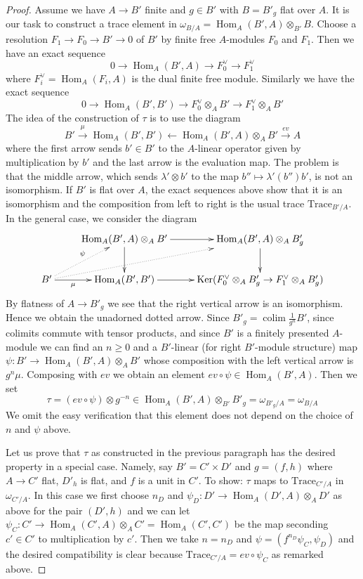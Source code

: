 \documentclass[10pt,a4paper]{amsart}
\theoremstyle{plain}
\theoremstyle{definition}
\theoremstyle{remark}
\numberwithin{equation}{subsection}
\def\colim{\mathop{\mathrm{colim}}\nolimits}
\def\Hom{\mathop{\mathrm{Hom}}\nolimits}
\def\Ker{\mathop{\mathrm{Ker}}}
\begin{document}
\begin{proof}
\medskip\noindent
Assume we have $A \to B'$ finite and $g \in B'$ with $B = B'_g$ flat over $A$.
It is our task to construct a trace element in
$\omega_{B/A} = \Hom_A(B', A) \otimes_{B'} B$.
Choose a resolution $F_1 \to F_0 \to B' \to 0$ of $B'$ by finite free
$A$-modules $F_0$ and $F_1$. Then we have an exact sequence
$$
0 \to \Hom_A(B', A) \to F_0^\vee \to F_1^\vee
$$
where $F_i^\vee = \Hom_A(F_i, A)$ is the dual finite free module.
Similarly we have the exact sequence
$$
0 \to \Hom_A(B', B') \to F_0^\vee \otimes_A B' \to F_1^\vee \otimes_A B'
$$
The idea of the construction of $\tau$ is to use the diagram
$$
B' \xrightarrow{\mu} \Hom_A(B', B')
\leftarrow \Hom_A(B', A) \otimes_A B'
\xrightarrow{ev} A
$$
where the first arrow sends $b' \in B'$ to the $A$-linear operator
given by multiplication by $b'$ and the last arrow is the evaluation map.
The problem is that the middle arrow, which sends $\lambda' \otimes b'$
to the map $b'' \mapsto \lambda'(b'')b'$, is not an isomorphism.
If $B'$ is flat over $A$, the exact sequences above show that it
is an isomorphism and the composition from left to right is the usual trace
$\text{Trace}_{B'/A}$. In the general case, we consider
the diagram
$$
\xymatrix{
& \Hom_A(B', A) \otimes_A B' \ar[r] \ar[d] &
\Hom_A(B', A) \otimes_A B'_g \ar[d] \\
B' \ar[r]_-\mu \ar@{..>}[rru] \ar@{..>}[ru]^\psi &
\Hom_A(B', B') \ar[r] &
\Ker(F_0^\vee \otimes_A B'_g \to F_1^\vee \otimes_A B'_g)
}
$$
By flatness of $A \to B'_g$ we see that the right vertical arrow is an
isomorphism. Hence we obtain the unadorned dotted arrow.
Since $B'_g = \colim \frac{1}{g^n}B'$, since
colimits commute with tensor products,
and since $B'$ is a finitely presented $A$-module
we can find an $n \geq 0$ and a $B'$-linear (for right $B'$-module structure)
map $\psi : B' \to \Hom_A(B', A) \otimes_A B'$
whose composition with the left vertical arrow is $g^n\mu$.
Composing with $ev$ we obtain an element
$ev \circ \psi \in \Hom_A(B', A)$. Then we set 
$$
\tau = (ev \circ \psi) \otimes g^{-n} \in
\Hom_A(B', A) \otimes_{B'} B'_g = \omega_{B'_g/A} = \omega_{B/A}
$$
We omit the easy verification that this element does not depend
on the choice of $n$ and $\psi$ above.

\medskip\noindent
Let us prove that $\tau$ as constructed in the previous paragraph
has the desired property in a special case. Namely, say
$B' = C' \times D'$ and $g = (f, h)$ where $A \to C'$ flat, $D'_h$ is flat, and
$f$ is a unit in $C'$.
To show: $\tau$ maps to $\text{Trace}_{C'/A}$ in $\omega_{C'/A}$.
In this case we first choose $n_D$ and
$\psi_D : D' \to \Hom_A(D', A) \otimes_A D'$ as above for the pair
$(D', h)$ and we can let
$\psi_C : C' \to \Hom_A(C', A) \otimes_A C' = \Hom_A(C', C')$
be the map seconding $c' \in C'$ to multiplication by $c'$.
Then we take $n = n_D$ and $\psi = (f^{n_D} \psi_C, \psi_D)$
and the desired compatibility is clear because
$\text{Trace}_{C'/A} = ev \circ \psi_C$ as remarked above.


\end{proof}
\end{document}
